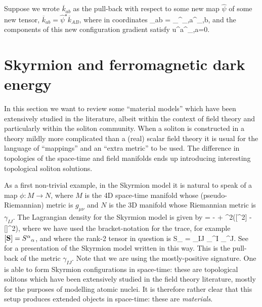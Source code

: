 Suppose we wrote $\overline{k}_{ab}$ as the pull-back with respect to some new map $\widehat{\psi}$ of some new tensor, $\overline{k}_{ab}=\widehat{\psi}^{\star}\overline{k}_{AB}$, where in coordinates
\bea
{}_{ab} = _{}{\widehat{\phi}^{}}{}_{,a}{\widehat{\phi}^{}}{}_{,b},
\eea
and the components of this new configuration gradient satisfy
\bea
u^a{\widehat{\phi}^{}}{}_{,a}=0.
\eea

\cleardoublepage
\section{Skyrmion and ferromagnetic dark energy}
 In this section we want to review some  ``material models'' which have been extensively studied in the literature, albeit within the context of field theory and particularly within the soliton community. When a soliton is constructed in a theory mildly more complicated than a (real) scalar field theory it is usual for the language of ``mappings'' and an ``extra metric'' to be used. The difference in topologies of the space-time and field manifolds ends up introducing interesting topological soliton solutions.

As a first non-trivial example, in the Skyrmion model it is natural to speak of a map $\phi : M \rightarrow N$, where $M$ is the 4D space-time manifold whose (pseudo-Riemannian) metric is $g_{\mu\nu}$ and $N$ is the 3D manifold whose Riemannian metric is $\gamma_{IJ}$. The  Lagrangian density for the Skyrmion model is given by
\bse
\label{eq:sec:lag-sky-model}
\bea
\label{eq:sec:lag-sky}
 = - \half [\rbm{S}] + \alpha^2\left([^2] -    []^2\right),
\eea
where we have used the bracket-notation for the trace, for example $[{\bf{S}}] = {S^{\alpha}}_{\alpha}$, and where the rank-2 tensor in question is
\bea
\label{sky-pull-b-metric}
S_{\alpha\beta} = \gamma_{IJ} \partial_{\alpha}\phi^I \partial_{\beta}\phi^J.
\eea
\ese
See \cite{pdes_gr_rendall, Bizon:2007qz} for a presentation of the Skyrmion model written in this way. This is the pull-back of the metric $\gamma_{IJ}$. Note that we are using the mostly-positive signature. One is able to form Skyrmion configurations in space-time: these are topological solitons \cite{dur4361} which have been extensively studied in the field theory literature, mostly for the purposes of modelling atomic nuclei. It is therefore rather clear that this setup produces extended objects in space-time: these are \textit{materials}. 

